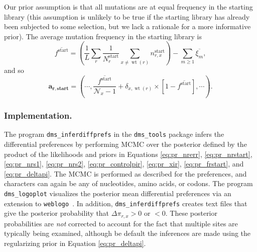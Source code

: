 \documentclass[twocolumn]{bmcart}%
\begin{document}
Our prior assumption is that all mutations are at equal frequency in the starting library (this assumption is unlikely to be true if the starting library has already been subjected to some selection, but we lack a rationale for a more informative prior). The average mutation frequency in the starting library is
\begin{equation}
\label{eq:avgfstart}
\overline{f^{\textrm{start}}} = \left(\frac{1}{L}\sum\limits_r \frac{1}{N_r^{\textrm{start}}}\sum\limits_{x\ne \operatorname{wt}\left(r\right)} n_{r,x}^{\textrm{start}}\right) - \sum\limits_{m \ge 1} \overline{\xi_m},
\end{equation}
and so 
\begin{equation}
\label{eq:arstart}
\boldsymbol{\mathbf{a_{r,\textbf{start}}}}= \left(\cdots, \frac{\overline{f^{\textrm{start}}}}{\mathcal{N}_x - 1} + \delta_{x,\operatorname{wt}\left(r\right)} \times \left[1 - \overline{f^{\textrm{start}}}\right] ,\cdots\right).
\end{equation}

\subsubsection*{Implementation.}
The program \texttt{dms\_inferdiffprefs} in the \texttt{dms\_tools} package infers the differential preferences by performing MCMC over the posterior defined by the product of the likelihoods and priors in Equations \ref{eq:pr_nrerr}, \ref{eq:pr_nrstart}, \ref{eq:pr_nrs1}, \ref{eq:pr_nrs2}, \ref{eq:pr_controlpir}, \ref{eq:pr_xir}, \ref{eq:pr_frstart}, and \ref{eq:pr_deltapi}. The MCMC is performed as described for the preferences, and characters can again be any of nucleotides, amino acids, or codons. The program \texttt{dms\_logoplot} visualizes the posterior mean differential preferences via an extension to \texttt{weblogo}~\cite{crooks2004}. In addition, \texttt{dms\_inferdiffprefs} creates text files that give the posterior probability that $\Delta\pi_{r,x} > 0$ or $< 0$. These posterior probabilities are \emph{not} corrected to account for the fact that multiple sites are typically being examined, although be default the inferences are made using the regularizing prior in Equation \ref{eq:pr_deltapi}.
\end{document}
